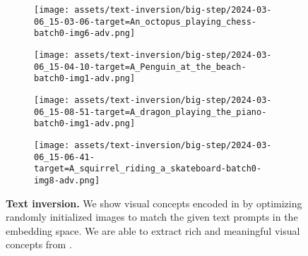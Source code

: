 \begin{figure*}[h]
\vspace{.5ex}
\begin{minipage}[t]{0.98\figwidth}
    \vspace{0pt}
    \begin{subfigure}[t]{0.25\columnwidth}
        \texttt{[image: assets/text-inversion/big-step/2024-03-06\_15-03-06-target=An\_octopus\_playing\_chess-batch0-img6-adv.png]}
    \end{subfigure}%
    \begin{subfigure}[t]{0.25\columnwidth}
        \texttt{[image: assets/text-inversion/big-step/2024-03-06\_15-04-10-target=A\_Penguin\_at\_the\_beach-batch0-img1-adv.png]}
    \end{subfigure}%
    \begin{subfigure}[t]{0.25\columnwidth}
        \texttt{[image: assets/text-inversion/big-step/2024-03-06\_15-08-51-target=A\_dragon\_playing\_the\_piano-batch0-img1-adv.png]}
    \end{subfigure}%
    \begin{subfigure}[t]{0.25\columnwidth}
        \texttt{[image: assets/text-inversion/big-step/2024-03-06\_15-06-41-target=A\_squirrel\_riding\_a\_skateboard-batch0-img8-adv.png]}
    \end{subfigure}%
\end{minipage}

\caption{\textbf{Text inversion.} We show visual concepts encoded in \rclip by optimizing randomly initialized images to match the given text prompts in the embedding space. %
We are able to extract rich and meaningful visual concepts from \rclip.
}
\label{fig:text-inv-short}
\end{figure*}